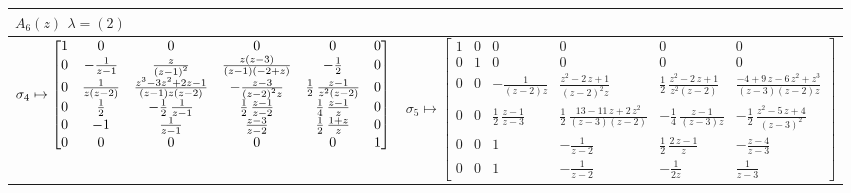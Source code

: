 \documentclass[11pt,a4paper,reqno,svgnames]{amsart}
\theoremstyle{plain}
\theoremstyle{definition}
\numberwithin{equation}{section}
\begin{document}
\begin{landscape}
\begin{table}[hhh]
\centering
\begin{tabular}{ll}
 \toprule
 $A_{6}(z)$ \qquad $\lambda=(2)$\\
 \midrule
$\sigma_4\mapsto
\begin{bmatrix}
1&0&0&0&0&0\\ 
0&-
 \frac{1}{z-1}&{\frac {z}{ \left( z-1 \right) ^{2}}}&{
\frac { z\left( z-3 \right) }{ \left( z-1 \right)  \left( -2+z
 \right) }}&-\frac{1}{2}&0\\ 
 0&{\frac {1}{z \left(z-2
 \right) }}&{\frac {{z}^{3}-3{z}^{2}+2z-1}{ \left( z-1 \right) z
 \left( z-2 \right) }}&-{\frac {z-3}{ \left(z-2 \right) ^{2}z}}&\frac{1}{2}
\,{\frac {z-1}{{z}^{2} \left(z-2\right) }}&0\\
0&
\frac{1}{2}&-\frac{1}{2}\, \frac{1}{z-1}&\frac{1}{2}\,{\frac {z-1}{z-2}}&\frac{1}{4}\,{
\frac {z-1}{z}}&0\\ 
0&-1& \frac{1}{z-1}&{
\frac {z-3}{z-2}}&\frac{1}{2}\,{\frac {1+z}{z}}&0\\ 
0&0&0&0&0&1
\end{bmatrix}
\medskip
$ &
$\sigma_5\mapsto
\begin{bmatrix}
1&0&0&0&0&0\\0&1&0&0&0
&0\\ 0&0&-{\frac {1}{ \left(z -2 \right) z}}&{\frac 
{{z}^{2}-2\,z+1}{ \left( z-2 \right) ^{2}z}}&\frac{1}{2}\,{\frac {{z}^{2}-2\,
z+1}{{z}^{2} \left( z-2 \right) }}&{\frac {-4+9\,z-6\,{z}^{2}+{z}^{3}
}{ \left( z-3 \right)  \left( z-2 \right) z}}\\0&0&
\frac{1}{2}\,{\frac {z-1}{z-3}}&\frac{1}{2}\,{\frac {13-11\,z+2\,{z}^{2}}{ \left( z-3
 \right)  \left( z-2 \right) }}&-\frac{1}{4}\,{\frac {z-1}{ \left( z-3
 \right) z}}&-\frac{1}{2}\,{\frac {{z}^{2}-5\,z+4}{ \left( z-3 \right) ^{2}}}
\\ 0&0&1&- \frac{1}{ z-2 }&\frac{1}{2}\,{\frac {2\,
z-1}{z}}&-{\frac {z-4}{z-3}} \\ 0&0&1&- \frac{1}{ z-2 }&-\frac{1}{2z}& \frac{1}{ z-3 }
\end{bmatrix}
$
\\

\bottomrule
\end{tabular}
\end{table} 
\end{landscape}
\end{document}
